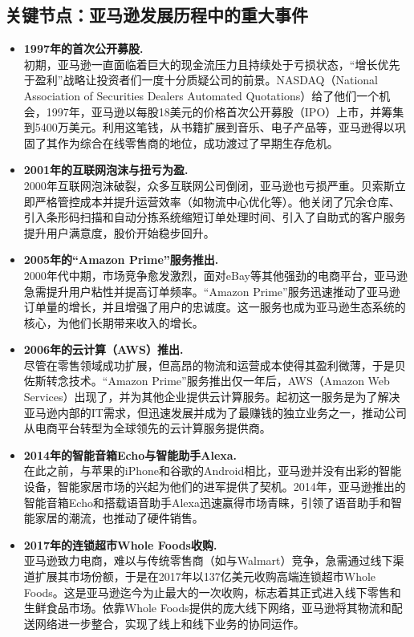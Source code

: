 \documentclass[12pt]{ctexart}
\begin{document}
\subsection{关键节点：亚马逊发展历程中的重大事件}
\begin{itemize}
    \item \textbf{1997年的首次公开募股.} \\
    初期，亚马逊一直面临着巨大的现金流压力且持续处于亏损状态，“增长优先于盈利”战略让投资者们一度十分质疑公司的前景。NASDAQ（National Association of Securities Dealers Automated Quotations）给了他们一个机会，1997年，亚马逊以每股18美元的价格首次公开募股（IPO）上市，并筹集到5400万美元。利用这笔钱，从书籍扩展到音乐、电子产品等，亚马逊得以巩固了其作为综合在线零售商的地位，成功渡过了早期生存危机。
    
    \item \textbf{2001年的互联网泡沫与扭亏为盈.} \\
    2000年互联网泡沫破裂，众多互联网公司倒闭，亚马逊也亏损严重。贝索斯立即严格管控成本并提升运营效率（如物流中心优化等）。他关闭了冗余仓库、引入条形码扫描和自动分拣系统缩短订单处理时间、引入了自助式的客户服务提升用户满意度，股价开始稳步回升。    
    
    \item \textbf{2005年的“Amazon Prime”服务推出.} \\
    2000年代中期，市场竞争愈发激烈，面对eBay等其他强劲的电商平台，亚马逊急需提升用户粘性并提高订单频率。“Amazon Prime”服务迅速推动了亚马逊订单量的增长，并且增强了用户的忠诚度。这一服务也成为亚马逊生态系统的核心，为他们长期带来收入的增长。
    
    \item \textbf{2006年的云计算（AWS）推出.} \\ 
    尽管在零售领域成功扩展，但高昂的物流和运营成本使得其盈利微薄，于是贝佐斯转念技术。“Amazon Prime”服务推出仅一年后，AWS（Amazon Web Services）出现了，并为其他企业提供云计算服务。起初这一服务是为了解决亚马逊内部的IT需求，但迅速发展并成为了最赚钱的独立业务之一，推动公司从电商平台转型为全球领先的云计算服务提供商。
    
    \item \textbf{2014年的智能音箱Echo与智能助手Alexa.} \\
    在此之前，与苹果的iPhone和谷歌的Android相比，亚马逊并没有出彩的智能设备，智能家居市场的兴起为他们的进军提供了契机。2014年，亚马逊推出的智能音箱Echo和搭载语音助手Alexa迅速赢得市场青睐，引领了语音助手和智能家居的潮流，也推动了硬件销售。
    
    \item \textbf{2017年的连锁超市Whole Foods收购.} \\
    亚马逊致力电商，难以与传统零售商（如与Walmart）竞争，急需通过线下渠道扩展其市场份额，于是在2017年以137亿美元收购高端连锁超市Whole Foods。这是亚马逊迄今为止最大的一次收购，标志着其正式进入线下零售和生鲜食品市场。依靠Whole Foods提供的庞大线下网络，亚马逊将其物流和配送网络进一步整合，实现了线上和线下业务的协同运作。
    

\end{itemize}
\end{document}
